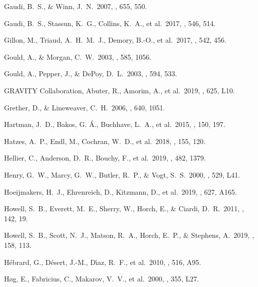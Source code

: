  Gaudi, B.~S., \& Winn, J.~N.\ 2007, \apj, 655, 550.

 Gaudi, B.~S., Stassun, K.~G., Collins, K.~A., et al.\ 2017, \nat, 546, 514.

 Gillon, M., Triaud, A.~H.~M.~J., Demory, B.-O., et al.\ 2017, \nat, 542, 456.

 Gould, A., \& Morgan, C.~W.\ 2003, \apj, 585, 1056.

 Gould, A., Pepper, J., \& DePoy, D.~L.\ 2003, \apj, 594, 533.

 GRAVITY Collaboration, Abuter, R., Amorim, A., et al.\ 2019, \aap, 625, L10.

 Grether, D., \& Lineweaver, C.~H.\ 2006, \apj, 640, 1051.

 Hartman, J.~D., Bakos, G. {\'A}., Buchhave, L.~A., et al.\ 2015, \aj, 150, 197.

 Hatzes, A.~P., Endl, M., Cochran, W.~D., et al.\ 2018, \aj, 155, 120.

 Hellier, C., Anderson, D.~R., Bouchy, F., et al.\ 2019, \mnras, 482, 1379.

 Henry, G.~W., Marcy, G.~W., Butler, R.~P., \& Vogt, S.~S.\ 2000, \apjl, 529, L41.

 Hoeijmakers, H.~J., Ehrenreich, D., Kitzmann, D., et al.\ 2019, \aap, 627, A165.

 Howell, S.~B., Everett, M.~E., Sherry, W., Horch, E., \& Ciardi, D.~R.\ 2011, \aj, 142, 19.

 Howell, S.~B., Scott, N.~J., Matson, R.~A., Horch, E.~P., \& Stephens, A.\ 2019, \aj, 158, 113.

 H{\'e}brard, G., D{\'e}sert, J.-M., D{\'\i}az, R.~F., et al.\ 2010, \aap, 516, A95.

 H{\o}g, E., Fabricius, C., Makarov, V.~V., et al.\ 2000, \aap, 355, L27.

